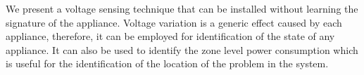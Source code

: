 We present a voltage sensing technique that can be installed without learning the signature of the appliance. Voltage variation is a generic effect caused by each appliance, therefore, it can be employed for identification of the state of any appliance. It can also be used to identify the zone level power consumption which is useful for the identification of the location of the problem in the system.

